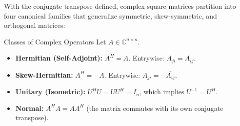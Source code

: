 With the conjugate transpose defined, complex square matrices partition into four canonical families that generalize symmetric, skew-symmetric, and orthogonal matrices:

\begin{definitionbox}{Classes of Complex Operators}
Let $A \in \mathbb{C}^{n \times n}$.
\begin{itemize}
    \item \textbf{Hermitian (Self-Adjoint):} $A^H = A$. Entrywise: $A_{ji} = \overline{A_{ij}}$.
    \item \textbf{Skew-Hermitian:} $A^H = -A$. Entrywise: $A_{ji} = -\overline{A_{ij}}$.
    \item \textbf{Unitary (Isometric):} $U^H U = U U^H = I_n$, which implies $U^{-1} = U^H$.
    \item \textbf{Normal:} $A^H A = A A^H$ (the matrix commutes with its own conjugate transpose).
\end{itemize}
\end{definitionbox}

